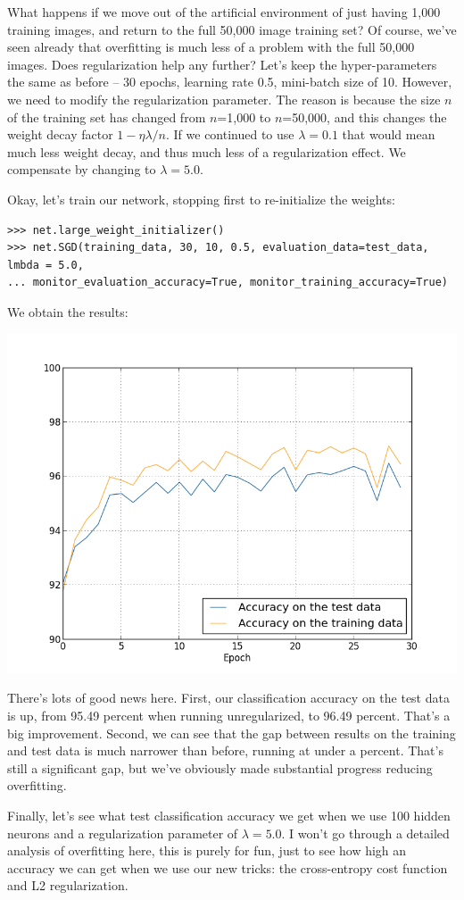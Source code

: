 \documentclass[a4paper,twoside,10pt]{book}
\begin{document}
What happens if we move out of the artificial environment of just having 1,000 training images, and return to the full 50,000 image training set? Of course, we've seen already that overfitting is much less of a problem with the full 50,000 images. Does regularization help any further? Let's keep the hyper-parameters the same as before -- 30 epochs, learning rate 0.5, mini-batch size of 10. However, we need to modify the regularization parameter. The reason is because the size $n$ of the training set has changed from $n$=1,000 to $n$=50,000, and this changes the weight decay factor $1-\eta\lambda/n$. If we continued to use $\lambda =0.1$ that would mean much less weight decay, and thus much less of a regularization effect. We compensate by changing to $\lambda =5.0$.

Okay, let's train our network, stopping first to re-initialize the weights:

\begin{lstlisting}
>>> net.large_weight_initializer()
>>> net.SGD(training_data, 30, 10, 0.5, evaluation_data=test_data, lmbda = 5.0,
... monitor_evaluation_accuracy=True, monitor_training_accuracy=True)
\end{lstlisting}
We obtain the results:
\begin{center}
	\includegraphics[width=0.6\linewidth]{figures/ch3/regularized_full}
\end{center}
There's lots of good news here. First, our classification accuracy on the test data is up, from 95.49 percent when running unregularized, to 96.49 percent. That's a big improvement. Second, we can see that the gap between results on the training and test data is much narrower than before, running at under a percent. That's still a significant gap, but we've obviously made substantial progress reducing overfitting.


Finally, let's see what test classification accuracy we get when we use 100 hidden neurons and a regularization parameter of $\lambda =5.0$. I won't go through a detailed analysis of overfitting here, this is purely for fun, just to see how high an accuracy we can get when we use our new tricks: the cross-entropy cost function and L2 regularization.
\end{document}
